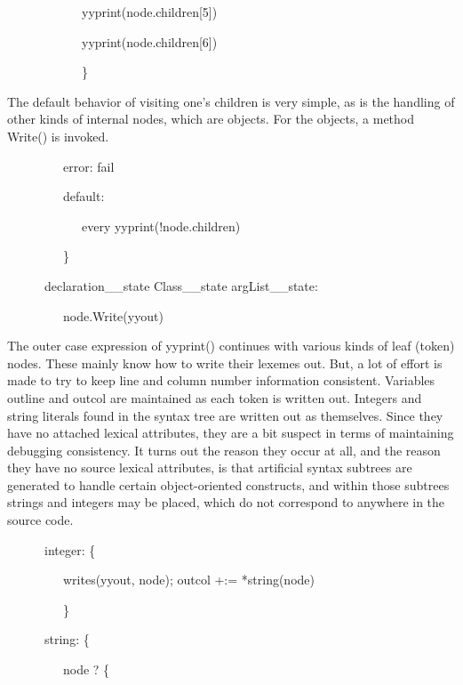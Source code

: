 {\ttfamily\mdseries
\ \ \ \ \ \ \ \ \ \ \ \ yyprint(node.children[5])}

{\ttfamily\mdseries
\ \ \ \ \ \ \ \ \ \ \ \ yyprint(node.children[6])}

{\ttfamily\mdseries
\ \ \ \ \ \ \ \ \ \ \ \ \}}

The default behavior of visiting one's children is very simple, as is
the handling of other kinds of internal nodes, which are objects. For
the objects, a method Write() is invoked.

{\ttfamily\mdseries
\ \ \ \ \ \ \ \ \ {\textquotedbl}error{\textquotedbl}: fail}

{\ttfamily\mdseries
\ \ \ \ \ \ \ \ \ default:}

{\ttfamily\mdseries
\ \ \ \ \ \ \ \ \ \ \ \ every yyprint(!node.children)}

{\ttfamily\mdseries
\ \ \ \ \ \ \ \ \ \}}

{\ttfamily\mdseries
\ \ \ \ \ \ {\textquotedbl}declaration\_\_state{\textquotedbl} {\textbar} {\textquotedbl}Class\_\_state{\textquotedbl}
{\textbar} {\textquotedbl}argList\_\_state{\textquotedbl}:}

{\ttfamily\mdseries
\ \ \ \ \ \ \ \ \ node.Write(yyout)}


The outer case expression of yyprint() continues with various kinds of
leaf (token) nodes. These mainly know how to write their lexemes
out. But, a lot of effort is made to try to keep line and column
number information consistent.  Variables outline and outcol are
maintained as each token is written out. Integers and string literals
found in the syntax tree are written out as themselves. Since they
have no attached lexical attributes, they are a bit suspect in terms
of maintaining debugging consistency. It turns out the reason they
occur at all, and the reason they have no source lexical attributes,
is that artificial syntax subtrees are generated to handle certain
object-oriented constructs, and within those subtrees strings and
integers may be placed, which do not correspond to anywhere in the
source code.

{\ttfamily\mdseries
\ \ \ \ \ \ {\textquotedbl}integer{\textquotedbl}: \{}

{\ttfamily\mdseries
\ \ \ \ \ \ \ \ \ writes(yyout, node); outcol +:= *string(node)}

{\ttfamily\mdseries
\ \ \ \ \ \ \ \ \ \}}

{\ttfamily\mdseries
\ \ \ \ \ \ {\textquotedbl}string{\textquotedbl}: \{}

{\ttfamily\mdseries
\ \ \ \ \ \ \ \ \ node ? \{}


